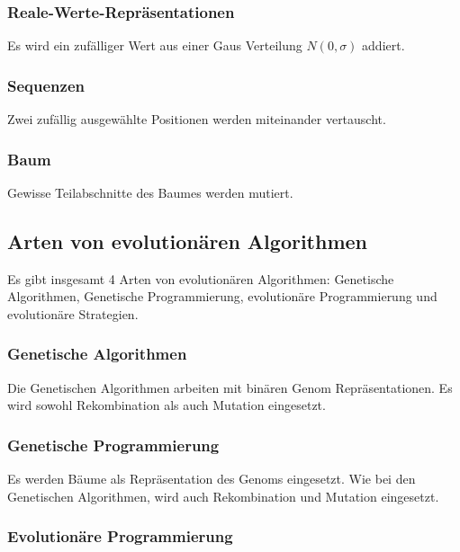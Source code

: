       \subsubsection{Reale-Werte-Repräsentationen}

        Es wird ein zufälliger Wert aus einer Gaus Verteilung \(N(0,\sigma)\) addiert.

      \subsubsection{Sequenzen}

        Zwei zufällig ausgewählte Positionen werden miteinander vertauscht.

      \subsubsection{Baum}

        Gewisse Teilabschnitte des Baumes werden mutiert.


  \subsection{Arten von evolutionären Algorithmen\label{sub:artenEvAlgos}}

    Es gibt insgesamt 4 Arten von evolutionären Algorithmen:
    Genetische Algorithmen, Genetische Programmierung, evolutionäre Programmierung
    und evolutionäre Strategien.

    \subsubsection{Genetische Algorithmen\label{item:genAlgo}}

      Die Genetischen Algorithmen arbeiten mit binären Genom Repräsentationen.
      Es wird sowohl Rekombination als auch Mutation eingesetzt.

    \subsubsection{Genetische Programmierung\label{item:genProg}}

      Es werden Bäume als Repräsentation des Genoms eingesetzt. Wie bei den Genetischen Algorithmen,
      wird auch Rekombination und Mutation eingesetzt.

    \subsubsection{Evolutionäre Programmierung\label{item:evProg}}

